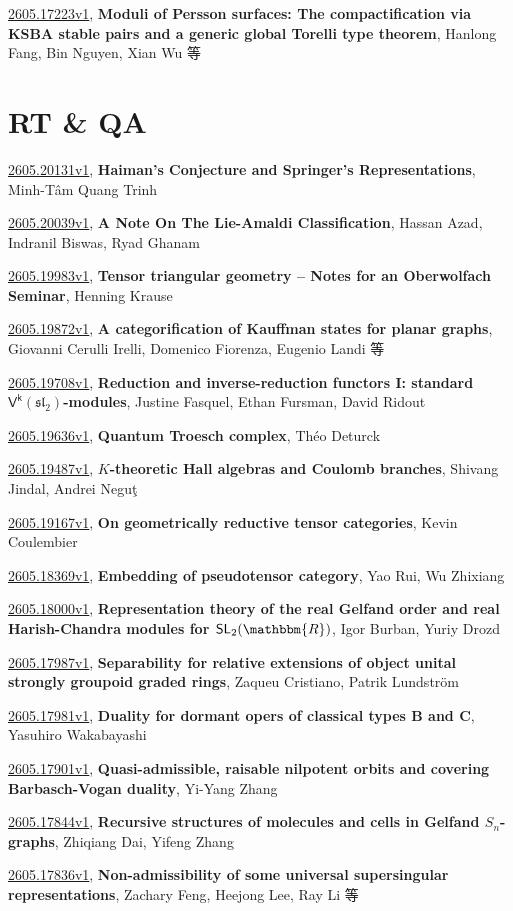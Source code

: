 \documentclass[9pt, a4paper]{article}
\theoremstyle{plain}
\theoremstyle{definition}
\theoremstyle{remark}
\newcommand{\arxiv}[3]{\href{https://arxiv.org/abs/#1}{#1}, \textbf{\textcolor{arxivblue}{#2}}, #3}
\begin{document}
\arxiv{2605.17223v1}{Moduli of Persson surfaces: The compactification via KSBA stable pairs and a generic global Torelli type theorem}{Hanlong Fang, Bin Nguyen, Xian Wu 等}


\section{RT \& QA}
\arxiv{2605.20131v1}{Haiman's Conjecture and Springer's Representations}{Minh-Tâm Quang Trinh}

\arxiv{2605.20039v1}{A Note On The Lie-Amaldi Classification}{Hassan Azad, Indranil Biswas, Ryad Ghanam}

\arxiv{2605.19983v1}{Tensor triangular geometry -- Notes for an Oberwolfach Seminar}{Henning Krause}

\arxiv{2605.19872v1}{A categorification of Kauffman states for planar graphs}{Giovanni Cerulli Irelli, Domenico Fiorenza, Eugenio Landi 等}

\arxiv{2605.19708v1}{Reduction and inverse-reduction functors I: standard $\mathsf{V^k}(\mathfrak{sl}_2)$-modules}{Justine Fasquel, Ethan Fursman, David Ridout}

\arxiv{2605.19636v1}{Quantum Troesch complex}{Théo Deturck}

\arxiv{2605.19487v1}{$K$-theoretic Hall algebras and Coulomb branches}{Shivang Jindal, Andrei Neguţ}

\arxiv{2605.19167v1}{On geometrically reductive tensor categories}{Kevin Coulembier}

\arxiv{2605.18369v1}{Embedding of pseudotensor category}{Yao Rui, Wu Zhixiang}

\arxiv{2605.18000v1}{Representation theory of the real Gelfand order and real Harish-Chandra modules for $\mathsf{SL}_2(\mathbbm{R})$}{Igor Burban, Yuriy Drozd}

\arxiv{2605.17987v1}{Separability for relative extensions of object unital strongly groupoid graded rings}{Zaqueu Cristiano, Patrik Lundström}

\arxiv{2605.17981v1}{Duality for dormant opers of classical types B and C}{Yasuhiro Wakabayashi}

\arxiv{2605.17901v1}{Quasi-admissible, raisable nilpotent orbits and covering Barbasch-Vogan duality}{Yi-Yang Zhang}

\arxiv{2605.17844v1}{Recursive structures of molecules and cells in Gelfand $S_n$-graphs}{Zhiqiang Dai, Yifeng Zhang}

\arxiv{2605.17836v1}{Non-admissibility of some universal supersingular representations}{Zachary Feng, Heejong Lee, Ray Li 等}
\end{document}
